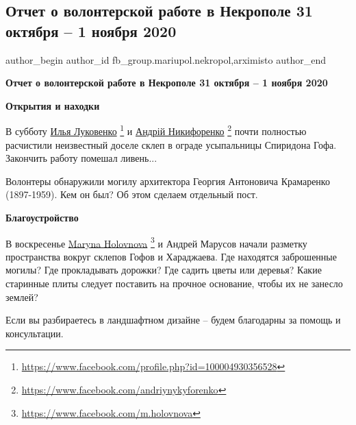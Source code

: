  
 
 
 
 

\subsection{Отчет о волонтерской работе в Некрополе 31 октября – 1 ноября 2020}
\label{sec:02_11_2020.fb.fb_group.mariupol.nekropol.1.otchet_volonter_rabota_31_oktjabrja_1_nojabrja_2020}
 
\ifcmt
 author_begin
   author_id fb_group.mariupol.nekropol,arximisto
 author_end
\fi

\textbf{Отчет о волонтерской работе в Некрополе 31 октября – 1 ноября 2020}

\textbf{Открытия и находки}

В субботу \href{https://www.facebook.com/profile.php?id=100004930356528}{Илья Луковенко}%
\footnote{\url{https://www.facebook.com/profile.php?id=100004930356528}}
и \href{https://www.facebook.com/andriynykyforenko}{Андрій Никифоренко}%
\footnote{\url{https://www.facebook.com/andriynykyforenko}}
почти полностью расчистили
неизвестный доселе склеп в ограде усыпальницы Спиридона Гофа. Закончить работу
помешал ливень...

Волонтеры обнаружили могилу архитектора Георгия Антоновича Крамаренко
(1897-1959). Кем он был? Об этом сделаем отдельный пост.

\textbf{Благоустройство}

В воскресенье \href{https://www.facebook.com/m.holovnova}{Maryna Holovnova}%
\footnote{\url{https://www.facebook.com/m.holovnova}}
и Андрей Марусов начали разметку пространства
вокруг склепов Гофов и Хараджаева. Где находятся заброшенные могилы? Где
прокладывать дорожки? Где садить цветы или деревья? Какие старинные плиты
следует поставить на прочное основание, чтобы их не занесло землей?

Если вы разбираетесь в ландшафтном дизайне – будем благодарны за помощь и
консультации.


